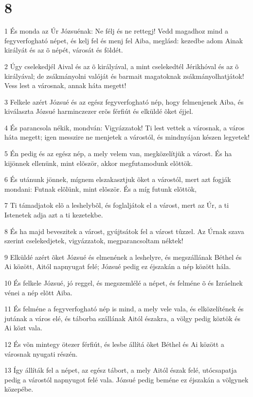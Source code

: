 \chapter{8}

\par 1 És monda az Úr Józsuénak: Ne félj és ne rettegj! Vedd magadhoz mind a fegyverfogható népet, és kelj fel és menj fel Aiba, meglásd: kezedbe adom Ainak királyát és az õ népét, városát és földét.
\par 2 Úgy cselekedjél Aival és az õ királyával, a mint cselekedtél Jérikhóval és az õ királyával; de zsákmányolni valóját és barmait magatoknak zsákmányolhatjátok! Vess lest a városnak, annak háta megett!
\par 3 Felkele azért Józsué és az egész fegyverfogható nép, hogy felmenjenek Aiba, és kiválaszta Józsué harminczezer erõs férfiút és elküldé õket éjjel.
\par 4 És parancsola nékik, mondván: Vigyázzatok! Ti lest vettek a városnak, a város háta megett; igen messzire ne menjetek a várostól, és mindnyájan készen legyetek!
\par 5 Én pedig és az egész nép, a mely velem van, megközelítjük a várost. És ha kijönnek ellenünk, mint elõször, akkor megfutamodunk elõttök.
\par 6 És utánunk jönnek, mígnem elszakasztjuk õket a várostól, mert azt fogják mondani: Futnak elõlünk, mint elõször. És a míg futunk elõttök,
\par 7 Ti támadjatok elõ a leshelybõl, és foglaljátok el a várost, mert az Úr, a ti Istenetek adja azt a ti kezetekbe.
\par 8 És ha majd beveszitek a várost, gyújtsátok fel a várost tûzzel. Az Úrnak szava szerint cselekedjetek, vigyázzatok, megparancsoltam néktek!
\par 9 Elküldé azért õket Józsué és elmenének a leshelyre, és megszállának Béthel és Ai között, Aitól napnyugat felé; Józsué pedig ez éjszakán a nép között hála.
\par 10 És felkele Józsué, jó reggel, és megszemlélé a népet, és felméne õ és Izráelnek vénei a nép elõtt Aiba.
\par 11 És felméne a fegyverfogható nép is mind, a mely vele vala, és elközelítének és jutának a város elé, és táborba szállának Aitól északra, a völgy pedig köztök és Ai közt vala.
\par 12 És võn mintegy ötezer férfiút, és lesbe állítá õket Béthel és Ai között a városnak nyugati részén.
\par 13 Így állíták fel a népet, az egész tábort, a mely Aitól észak felé, utócsapatja pedig a várostól napnyugot felé vala. Józsué pedig beméne ez éjszakán a völgynek közepébe.
